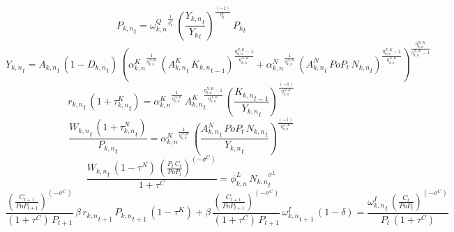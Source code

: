 \begin{dmath}
{{P_{k,n}}}_{t}={{\omega^{Q}_{k,n}}}^{\frac{1}{{{\eta^{C}_{k}}}}}\, \left(\frac{{{Y_{k,n}}}_{t}}{{{Y_k}}_{t}}\right)^{\frac{\left(-1\right)}{{{\eta^{C}_{k}}}}}\, {{P_k}}_{t}
\end{dmath}
\noindent[name= `sector specific output']
\begin{dmath}
{{Y_{k,n}}}_{t}={{A_{k,n}}}_{t}\, \left(1-{{D_{k,n}}}_{t}\right)\, \left({{\alpha^{K}_{k,n}}}^{\frac{1}{{{\eta^{N,K}_{k,n}}}}}\, \left({{A^{K}_{k,n}}}_{t}\, {{K_{k,n}}}_{t-1}\right)^{\frac{{{\eta^{N,K}_{k,n}}}-1}{{{\eta^{N,K}_{k,n}}}}}+{{\alpha^{N}_{k,n}}}^{\frac{1}{{{\eta^{N,K}_{k,n}}}}}\, \left({{A^{N}_{k,n}}}_{t}\, {PoP}_{t}\, {{N_{k,n}}}_{t}\right)^{\frac{{{\eta^{N,K}_{k,n}}}-1}{{{\eta^{N,K}_{k,n}}}}}\right)^{\frac{{{\eta^{N,K}_{k,n}}}}{{{\eta^{N,K}_{k,n}}}-1}}
\end{dmath}
\noindent[mcp= `K\_1\_1 > 0', name= `firms FOC capital']
\begin{dmath}
{{r_{k,n}}}_{t}\, \left(1+{{\tau^{K}_{k,n}}}_{t}\right)={{\alpha^{K}_{k,n}}}^{\frac{1}{{{\eta^{N,K}_{k,n}}}}}\, {{A^{K}_{k,n}}}_{t}^{\frac{{{\eta^{N,K}_{k,n}}}-1}{{{\eta^{N,K}_{k,n}}}}}\, \left(\frac{{{K_{k,n}}}_{t-1}}{{{Y_{k,n}}}_{t}}\right)^{\frac{\left(-1\right)}{{{\eta^{N,K}_{k,n}}}}}
\end{dmath}
\noindent[mcp= `N\_1\_1 > 0', name= `firms FOC labour']
\begin{dmath}
\frac{{{W_{k,n}}}_{t}\, \left(1+{{\tau^{N}_{k,n}}}_{t}\right)}{{{P_{k,n}}}_{t}}={{\alpha^{N}_{k,n}}}^{\frac{1}{{{\eta^{N,K}_{k,n}}}}}\, \left(\frac{{{A^{N}_{k,n}}}_{t}\, {PoP}_{t}\, {{N_{k,n}}}_{t}}{{{Y_{k,n}}}_{t}}\right)^{\frac{\left(-1\right)}{{{\eta^{N,K}_{k,n}}}}}
\end{dmath}
\noindent[mcp= `N\_1\_1>0', name= `HH FOC labour']
\begin{dmath}
\frac{{{W_{k,n}}}_{t}\, \left(1-{{\tau^{N}}}\right)\, \left(\frac{{P}_{t}\, {C}_{t}}{{PoP}_{t}}\right)^{\left(-{{\sigma^{C}}}\right)}}{1+{{\tau^{C}}}}={{\phi^{L}_{k,n}}}\, {{N_{k,n}}}_{t}^{{{\sigma^{L}}}}
\end{dmath}
\noindent[mcp= `K\_1\_1>0', name= `HH FOC capital']
\begin{dmath}
\frac{\left(\frac{{C}_{t+1}}{{PoP}_{t+1}}\right)^{\left(-{{\sigma^{C}}}\right)}}{\left(1+{{\tau^{C}}}\right)\, {P}_{t+1}}\, {{\beta}}\, {{r_{k,n}}}_{t+1}\, {{P_{k,n}}}_{t+1}\, \left(1-{{\tau^{K}}}\right)+{{\beta}}\, \frac{\left(\frac{{C}_{t+1}}{{PoP}_{t+1}}\right)^{\left(-{{\sigma^{C}}}\right)}}{\left(1+{{\tau^{C}}}\right)\, {P}_{t+1}}\, {{\omega^I_{k,n}}}_{t+1}\, \left(1-{{\delta}}\right)=\frac{{{\omega^I_{k,n}}}_{t}\, \left(\frac{{C}_{t}}{{PoP}_{t}}\right)^{\left(-{{\sigma^{C}}}\right)}}{{P}_{t}\, \left(1+{{\tau^{C}}}\right)}
\end{dmath}
